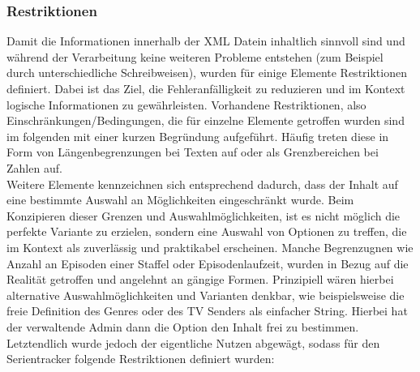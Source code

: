\documentclass[a4paper]{article}
\begin{document}
\subsubsection{Restriktionen}
Damit die Informationen innerhalb der XML Datein inhaltlich sinnvoll sind und während der Verarbeitung keine weiteren Probleme entstehen (zum Beispiel durch unterschiedliche Schreibweisen), wurden für einige Elemente Restriktionen definiert.
Dabei ist das Ziel, die Fehleranfälligkeit zu reduzieren und im Kontext logische Informationen zu gewährleisten. Vorhandene Restriktionen, also Einschränkungen/Bedingungen, die für einzelne Elemente getroffen wurden sind im folgenden mit einer kurzen Begründung aufgeführt. Häufig treten diese in Form von Längenbegrenzungen bei Texten auf oder als Grenzbereichen bei Zahlen auf.\\
Weitere Elemente kennzeichnen sich entsprechend dadurch, dass der Inhalt auf eine bestimmte Auswahl an Möglichkeiten eingeschränkt wurde. Beim Konzipieren dieser Grenzen und Auswahlmöglichkeiten, ist es nicht möglich die perfekte Variante zu erzielen, sondern eine Auswahl von Optionen zu treffen, die im Kontext als zuverlässig und praktikabel erscheinen. Manche Begrenzugnen wie Anzahl an Episoden einer Staffel oder Episodenlaufzeit, wurden in Bezug auf die Realität getroffen und angelehnt an gängige Formen. Prinzipiell wären hierbei  alternative Auswahlmöglichkeiten und Varianten denkbar, wie beispielsweise die freie Definition des Genres oder des TV Senders als einfacher String. Hierbei hat der verwaltende Admin dann die Option den Inhalt frei zu bestimmen. Letztendlich wurde jedoch der eigentliche Nutzen abgewägt, sodass für den Serientracker folgende Restriktionen definiert wurden:
\end{document}
